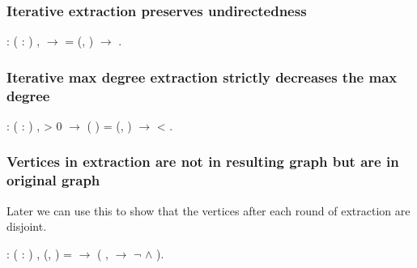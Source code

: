 \subsubsection{Iterative extraction preserves undirectedness}


\begin{coqdoccode}
\coqdocnoindent
{}  : \coqdockw{\ensuremath{\forall}} (  : )  ,\coqdoceol
\coqdocindent{2.00em}
  \ensuremath{\rightarrow}\coqdoceol
\coqdocindent{2.00em}
   = (, ) \ensuremath{\rightarrow}\coqdoceol
\coqdocindent{2.00em}
 .\coqdoceol
\coqdocemptyline
\end{coqdoccode}
\subsubsection{Iterative max degree extraction strictly decreases the max degree}


\begin{coqdoccode}
\coqdocnoindent
{}  : \coqdockw{\ensuremath{\forall}} (  : ) ,\coqdoceol
\coqdocindent{2.00em}
  > 0 \ensuremath{\rightarrow}\coqdoceol
\coqdocindent{2.00em}
  ( ) = (, ) \ensuremath{\rightarrow}\coqdoceol
\coqdocindent{2.00em}
  <  .\coqdoceol
\coqdocemptyline
\end{coqdoccode}
\subsubsection{Vertices in extraction are not in resulting graph but are in original graph}

 Later we can use this to show that the vertices after each round
    of extraction are disjoint.
\begin{coqdoccode}
\coqdocemptyline
\coqdocnoindent
{}  : \coqdockw{\ensuremath{\forall}} (  : )  ,\coqdoceol
\coqdocindent{2.00em}
(, ) =    \ensuremath{\rightarrow}\coqdoceol
\coqdocindent{2.00em}
(\coqdockw{\ensuremath{\forall}} ,    \ensuremath{\rightarrow} \ensuremath{\lnot}    \ensuremath{\land}   ).\coqdoceol
\coqdocemptyline
\end{coqdoccode}
